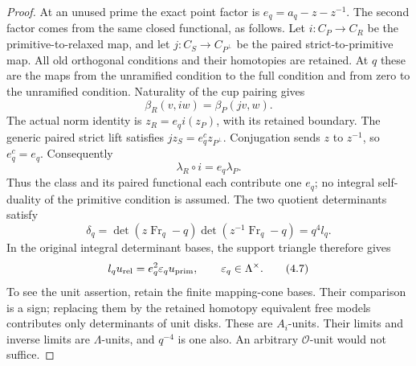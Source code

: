 \documentclass[11pt]{article}
\theoremstyle{definition}
\theoremstyle{remark}
\providecommand{\mathscr}[1]{\mathcal{#1}}
\begin{document}
\begin{proof}\leavevmode
At an unused prime the exact point factor is $e_q=a_q-z-z^{-1}$.
The second factor comes from the same closed functional, as follows.
Let $i:C_P\to C_R$ be the primitive-to-relaxed map, and let
$j:C_S\to C_{P^\perp}$ be the paired strict-to-primitive map.
All old orthogonal conditions and their homotopies are retained.
At $q$ these are the maps from the unramified condition to the full
condition and from zero to the unramified condition. Naturality of
the cup pairing \cite[Sections 6.4.1--6.4.3]{nekovar} gives
\[
             \beta_R(v,iw)=\beta_P(jv,w).
\]
The actual norm identity is $z_R=e_q i(z_P)$, with its retained
boundary. The generic paired strict lift satisfies
$jz_S=e_q^c z_{P^\perp}$. Conjugation sends $z$ to $z^{-1}$, so
$e_q^c=e_q$. Consequently
\[
                 \lambda_R\circ i=e_q\lambda_P.
\]
Thus the class and its paired functional each contribute one
$e_q$; no integral self-duality of the primitive condition is assumed.
The two quotient determinants satisfy
\[
 \delta_q=\det(z\operatorname{Fr}_q-q)
              \det(z^{-1}\operatorname{Fr}_q-q)=q^4l_q.
\]
In the original integral determinant bases, the support triangle
therefore gives
\[
       l_q u_{\rm rel}=e_q^2\varepsilon_q u_{\rm prim},
             \qquad \varepsilon_q\in\Lambda^\times.             \tag{4.7}
\]
To see the unit assertion, retain the finite mapping-cone bases.
Their comparison is a sign; replacing them by the retained homotopy
equivalent free models contributes only determinants of unit disks.
These are $A_i$-units. Their limits and inverse limits are
$\Lambda$-units, and $q^{-4}$ is one also. An arbitrary
$\mathscr O$-unit would not suffice.


\end{proof}
\end{document}
